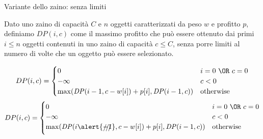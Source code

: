 \begin{frame}{Variante dello zaino: senza limiti}

\vspace{-9pt}
\begin{myboxtitle}
Dato uno zaino di capacità $C$ e $n$ oggetti caratterizzati
da peso $w$ e profitto $p$, definiamo $\mathit{DP}(i,c)$ come il
massimo profitto che può essere ottenuto dai primi $i \leq n$
oggetti contenuti in uno zaino di capacità $c \leq C$, \alert{senza porre
limiti al numero di volte che un oggetto può essere selezionato}.
\end{myboxtitle}


\small
\begin{overprint}
\[
DP(i,c) = \begin{cases}
  0 & i=0\ \OR\ c=0 \\
  -\infty & c < 0 \\
  \max( \mathit{DP}(i-1,c-w[i]) + p[i], \mathit{DP}(i-1,c) ) & \textrm{otherwise}
\end{cases}
\]
\[
DP(i,c) = \begin{cases}
  0 & i=0\ \OR\ c=0 \\
  -\infty & c < 0 \\
  \max( \mathit{DP}(i\alert{\xout{-1}},c-w[i]) + p[i], \mathit{DP}(i-1,c) ) & \textrm{otherwise}
\end{cases}
\]
\end{overprint}

\end{frame}


